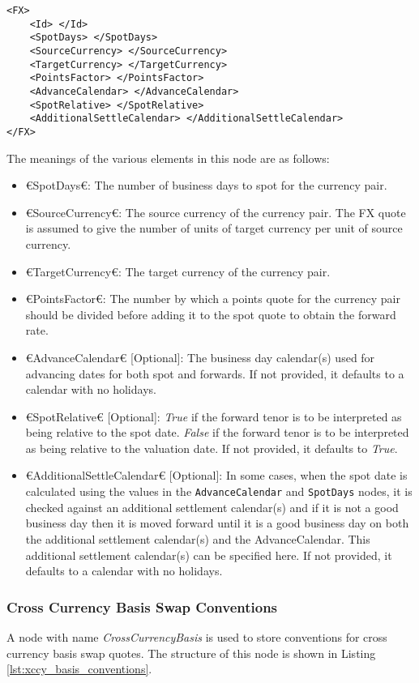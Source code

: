 \begin{lstlisting}[caption={FX conventions}, label=lst:fx_conventions]
<FX>
	<Id> </Id>
	<SpotDays> </SpotDays>
	<SourceCurrency> </SourceCurrency>
	<TargetCurrency> </TargetCurrency>
	<PointsFactor> </PointsFactor>
	<AdvanceCalendar> </AdvanceCalendar>
	<SpotRelative> </SpotRelative>
	<AdditionalSettleCalendar> </AdditionalSettleCalendar>
</FX>
\end{lstlisting}

The meanings of the various elements in this node are as follows:
\begin{itemize}
\item €SpotDays€: The number of business days to spot for the currency pair.
\item €SourceCurrency€: The source currency of the currency pair. The FX quote is assumed to give the number of units of 
target currency per unit of source currency.
\item €TargetCurrency€: The target currency of the currency pair.
\item €PointsFactor€: The number by which a points quote for the currency pair should be divided before adding it to the 
spot quote to obtain the forward rate.
\item €AdvanceCalendar€ [Optional]: The business day calendar(s) used for advancing dates for both spot and forwards. If not 
provided, it defaults to a calendar with no holidays.
\item €SpotRelative€ [Optional]: \emph{True} if the forward tenor is to be interpreted as being relative to the spot date. 
\emph{False} if the forward tenor is to be interpreted as being relative to the valuation date. If not provided, it 
defaults to \emph{True}.
\item €AdditionalSettleCalendar€ [Optional]: In some cases, when the spot date is calculated using the values in the 
\lstinline!AdvanceCalendar! and \lstinline!SpotDays! nodes, it is checked against an additional settlement calendar(s) and 
if it is not a good business day then it is moved forward until it is a good business day on both the additional 
settlement calendar(s) and the AdvanceCalendar. This additional settlement calendar(s) can be specified here. If not 
provided, it defaults to a calendar with no holidays.
\end{itemize}

\subsubsection{Cross Currency Basis Swap Conventions}
A node with name \emph{CrossCurrencyBasis} is used to store conventions for cross currency basis swap quotes. The 
structure of this node is shown in Listing \ref{lst:xccy_basis_conventions}.


